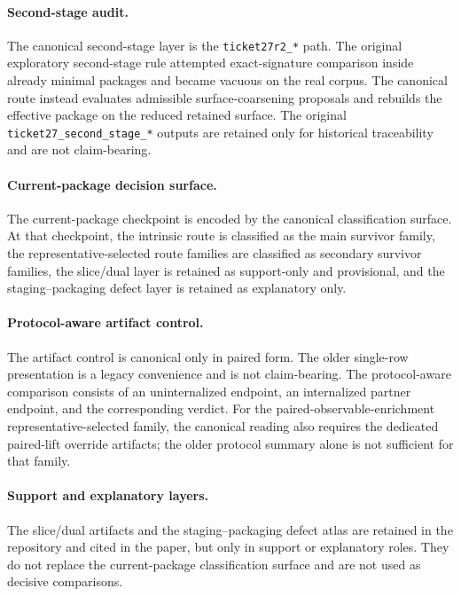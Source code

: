 \documentclass[11pt]{article}
\theoremstyle{definition}
\begin{document}
\paragraph{Second-stage audit.}
The canonical second-stage layer is the \texttt{ticket27r2\_*} path. The original exploratory second-stage rule attempted exact-signature comparison inside already minimal packages and became vacuous on the real corpus. The canonical route instead evaluates admissible surface-coarsening proposals and rebuilds the effective package on the reduced retained surface. The original \texttt{ticket27\_second\_stage\_*} outputs are retained only for historical traceability and are not claim-bearing.

\paragraph{Current-package decision surface.}
The current-package checkpoint is encoded by the canonical classification surface. At that checkpoint, the intrinsic route is classified as the main survivor family, the representative-selected route families are classified as secondary survivor families, the slice/dual layer is retained as support-only and provisional, and the staging--packaging defect layer is retained as explanatory only.

\paragraph{Protocol-aware artifact control.}
The artifact control is canonical only in paired form. The older single-row presentation is a legacy convenience and is not claim-bearing. The protocol-aware comparison consists of an uninternalized endpoint, an internalized partner endpoint, and the corresponding verdict. For the paired-observable-enrichment representative-selected family, the canonical reading also requires the dedicated paired-lift override artifacts; the older protocol summary alone is not sufficient for that family.

\paragraph{Support and explanatory layers.}
The slice/dual artifacts and the staging--packaging defect atlas are retained in the repository and cited in the paper, but only in support or explanatory roles. They do not replace the current-package classification surface and are not used as decisive comparisons.
\end{document}
